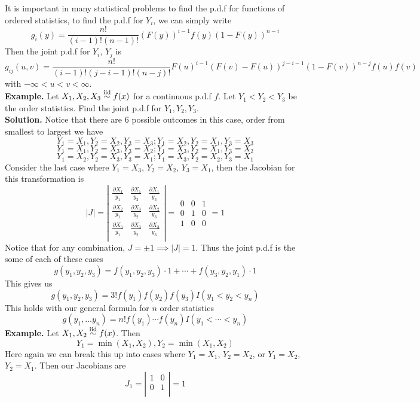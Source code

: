 \documentclass[openany]{report}
\begin{document}
     It is important in many statistical problems to find the p.d.f for functions of ordered statistics, to find the p.d.f for $Y_i$, we can simply write 
     \[g_i(y) = \frac{n!}{(i-1)!(n-1)!}(F(y ))^{i-1}f(y)(1-F(y))^{n-i}\]
     Then the joint p.d.f for $Y_i$, $Y_j$ is 
     \[g_{ij}(u,v) = \frac{n!}{(i-1)!(j-i-1)!(n-j)!}F(u)^{i-1}(F(v)-F(u))^{j-i-1}(1-F(v))^{n-j}f(u)f(v)\]
     with $-\infty < u < v < \infty$.\\[2ex]
     \textbf{Example.} Let $X_1,X_2,X_3 \overset{\mathrm{iid}}{\sim} f(x)$ for a continuous p.d.f $f$. Let $Y_1 < Y_2 < Y_3$ be the order statistics. Find the joint p.d.f for $Y_1,Y_2,Y_3$.\\[2ex]
     \textbf{Solution.} Notice that there are 6 possible outcomes in this case, order from smallest to largest we have 
     \[Y_1 = X_1, Y_2 = X_2, Y_3 = X_3; Y_1 = X_2, Y_2 = X_1, Y_3 = X_3\]
     \[Y_1 = X_1, Y_2 = X_3, Y_3 = X_2; Y_1 = X_3, Y_2 = X_1, Y_3 = X_2\]
     \[Y_1 = X_2, Y_2 = X_3, Y_3 = X_1; Y_1 = X_3, Y_2 = X_2, Y_3 = X_1\]
     Consider the last case where $Y_1 = X_3$, $Y_2 = X_2$, $Y_3 = X_1$, then the Jacobian for this transformation is 
     \[|J| = \left|\begin{matrix}
        \frac{\partial X_1}{y_1} & \frac{\partial X_1}{y_2} & \frac{\partial X_1}{y_3}\\
        \frac{\partial X_2}{y_1} & \frac{\partial X_3}{y_2} & \frac{\partial X_2}{y_3}\\
        \frac{\partial X_3}{y_1} & \frac{\partial X_3}{y_2} & \frac{\partial X_3}{y_3}\\
     \end{matrix}\right| = \begin{matrix}
        0 & 0 & 1\\
        0 & 1 & 0\\
        1 & 0 & 0
     \end{matrix} = 1 \]
     Notice that for any combination, $J = \pm 1 \implies |J| = 1$. Thus the joint p.d.f is the some of each of these cases 
     \[g(y_1,y_2, y_3) = f(y_1,y_2,y_3)\cdot 1 + \cdots + f(y_3,y_2,y_1)\cdot 1\]
     This gives us 
     \[g(y_1,y_2,y_3) = 3!f(y_1)f(y_2)f(y_3)I(y_1 < y_2 < y_n)\]
     This holds with our general formula for $n$ order statistics
     \[g(y_1,\ldots y_n) = n!f(y_1)\cdots f(y_n)I(y_1 < \cdots < y_n)\]
     \textbf{Example.} Let $X_1,X_2 \overset{\mathrm{iid}}{\sim} f(x)$. Then 
     \[Y_1 = \min(X_1, X_2), Y_2 = \min(X_1, X_2)\]
     Here again we can break this up into cases where $Y_1 = X_1$, $Y_2 = X_2$, or $Y_1 = X_2$, $Y_2 = X_1$. Then our Jacobians are 
     \[J_1 = \left|\begin{matrix}
        1 & 0 \\
        0 & 1\\
     \end{matrix}\right| = 1\]
     
\end{document}
